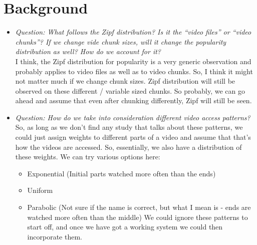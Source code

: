 \section{Background} \label{sec:background}
\begin{itemize}
  \item \emph{Question: What follows the Zipf distribution? Is it the ``video
    files'' or ``video chunks''? If we change vide chunk sizes, will it
    change the popularity distribution as well? How do we account for
    it?} \\
    I think, the Zipf distribution for popularity is a very
    generic observation and probably applies to video files as well as
    to video chunks. So, I think it might not matter much if we change
    chunk sizes. Zipf distribution will still be observed on these
    different / variable sized chunks. So probably, we can go ahead
    and assume that even after chunking differently, Zipf will still
    be seen.

    \item \emph{Question: How do we take into consideration different
      video access patterns?} \\ So, as long as we don't find any
      study that talks about these patterns, we could just assign
      weights to different parts of a video and assume that that's how
      the videos are accessed. So, essentially, we also have a
      distribution of these weights. We can try various options here:
      \begin{itemize}
        \item Exponential (Initial parts watched more often than the ends)
        \item Uniform
        \item Parabolic (Not sure if the name is correct, but what I
          mean is - ends are watched more often than the middle) We
          could ignore these patterns to start off, and once we have
          got a working system we could then incorporate them.
      \end{itemize}
\end{itemize}
